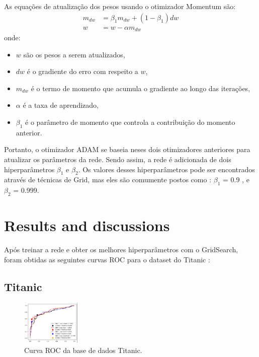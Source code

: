 \documentclass[conference]{IEEEtran}
\begin{document}
As equações de atualização dos pesos usando o otimizador Momentum são:
\begin{align*}
m_{dw} & = \beta_{1} m_{dw} + (1 - \beta_{1}) dw \\
w & = w - \alpha m_{dw}
\end{align*}
onde:
\begin{itemize}
    \item \( w \) são os pesos a serem atualizados,
    \item \( dw \) é o gradiente do erro com respeito a \( w \),
    \item \( m_{dw} \) é o termo de momento que acumula o gradiente ao longo das iterações,
    \item \( \alpha \) é a taxa de aprendizado,
    \item \( \beta_{1} \) é o parâmetro de momento que controla a contribuição do momento anterior.
\end{itemize}

Portanto, o otimizador ADAM se baseia neses dois otimizadores anteriores para atualizar os parâmetros da rede. Sendo assim, a rede é adicionada de dois hiperparâmetros \( \beta_{1} \) e \( \beta_{2} \). Os valores desses hiperparâmetros pode ser encontrados através de técnicas de Grid, mas eles são comumente postos como : \( \beta_{1} \) = 0.9 , e \( \beta_{2} \) = 0.999.

\section{Results and discussions}

Após treinar a rede e obter os melhores hiperparâmetros com o GridSearch, foram obtidas as seguintes curvas ROC para o dataset do Titanic : 

\subsection{Titanic}

\vspace{20pt}

\begin{figure}[htbp]
\centerline{\includegraphics[width=0.25\textwidth]{ROC_curve_1.png}}
\caption{Curva ROC da base de dados Titanic.}
\label{fig}
\end{figure}
\end{document}
